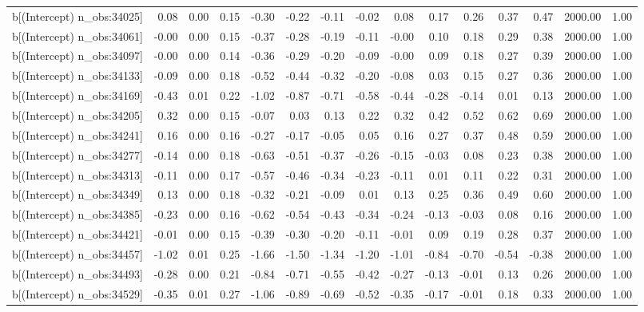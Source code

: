\begin{table}[ht]
\begin{tabular}{rrrrrrrrrrrrrrr}
  b[(Intercept) n\_obs:34025] & 0.08 & 0.00 & 0.15 & -0.30 & -0.22 & -0.11 & -0.02 & 0.08 & 0.17 & 0.26 & 0.37 & 0.47 & 2000.00 & 1.00 \\ 
  b[(Intercept) n\_obs:34061] & -0.00 & 0.00 & 0.15 & -0.37 & -0.28 & -0.19 & -0.11 & -0.00 & 0.10 & 0.18 & 0.29 & 0.38 & 2000.00 & 1.00 \\ 
  b[(Intercept) n\_obs:34097] & -0.00 & 0.00 & 0.14 & -0.36 & -0.29 & -0.20 & -0.09 & -0.00 & 0.09 & 0.18 & 0.27 & 0.39 & 2000.00 & 1.00 \\ 
  b[(Intercept) n\_obs:34133] & -0.09 & 0.00 & 0.18 & -0.52 & -0.44 & -0.32 & -0.20 & -0.08 & 0.03 & 0.15 & 0.27 & 0.36 & 2000.00 & 1.00 \\ 
  b[(Intercept) n\_obs:34169] & -0.43 & 0.01 & 0.22 & -1.02 & -0.87 & -0.71 & -0.58 & -0.44 & -0.28 & -0.14 & 0.01 & 0.13 & 2000.00 & 1.00 \\ 
  b[(Intercept) n\_obs:34205] & 0.32 & 0.00 & 0.15 & -0.07 & 0.03 & 0.13 & 0.22 & 0.32 & 0.42 & 0.52 & 0.62 & 0.69 & 2000.00 & 1.00 \\ 
  b[(Intercept) n\_obs:34241] & 0.16 & 0.00 & 0.16 & -0.27 & -0.17 & -0.05 & 0.05 & 0.16 & 0.27 & 0.37 & 0.48 & 0.59 & 2000.00 & 1.00 \\ 
  b[(Intercept) n\_obs:34277] & -0.14 & 0.00 & 0.18 & -0.63 & -0.51 & -0.37 & -0.26 & -0.15 & -0.03 & 0.08 & 0.23 & 0.38 & 2000.00 & 1.00 \\ 
  b[(Intercept) n\_obs:34313] & -0.11 & 0.00 & 0.17 & -0.57 & -0.46 & -0.34 & -0.23 & -0.11 & 0.01 & 0.11 & 0.22 & 0.31 & 2000.00 & 1.00 \\ 
  b[(Intercept) n\_obs:34349] & 0.13 & 0.00 & 0.18 & -0.32 & -0.21 & -0.09 & 0.01 & 0.13 & 0.25 & 0.36 & 0.49 & 0.60 & 2000.00 & 1.00 \\ 
  b[(Intercept) n\_obs:34385] & -0.23 & 0.00 & 0.16 & -0.62 & -0.54 & -0.43 & -0.34 & -0.24 & -0.13 & -0.03 & 0.08 & 0.16 & 2000.00 & 1.00 \\ 
  b[(Intercept) n\_obs:34421] & -0.01 & 0.00 & 0.15 & -0.39 & -0.30 & -0.20 & -0.11 & -0.01 & 0.09 & 0.19 & 0.28 & 0.37 & 2000.00 & 1.00 \\ 
  b[(Intercept) n\_obs:34457] & -1.02 & 0.01 & 0.25 & -1.66 & -1.50 & -1.34 & -1.20 & -1.01 & -0.84 & -0.70 & -0.54 & -0.38 & 2000.00 & 1.00 \\ 
  b[(Intercept) n\_obs:34493] & -0.28 & 0.00 & 0.21 & -0.84 & -0.71 & -0.55 & -0.42 & -0.27 & -0.13 & -0.01 & 0.13 & 0.26 & 2000.00 & 1.00 \\ 
  b[(Intercept) n\_obs:34529] & -0.35 & 0.01 & 0.27 & -1.06 & -0.89 & -0.69 & -0.52 & -0.35 & -0.17 & -0.01 & 0.18 & 0.33 & 2000.00 & 1.00 \\ 

\end{tabular}
\end{table}
